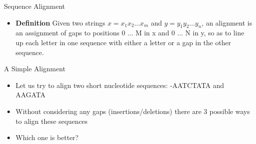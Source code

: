 \documentclass{bredelebeamer}
\begin{document}
\begin{frame}{Sequence Alignment}
    \begin{itemize}
        \item \textbf{\large{Definition}}
        \linebreak
        \linebreak
        Given two strings $x = x_1 x_2 ... x_m$ and $y = y_1 y_2 ... y_n$, \linebreak
        an alignment is an assignment of gaps to positions 0 ... M in x and 0 ... N in y, so as to line up each letter in one sequence with either a letter or a gap in the other sequence.
    \end{itemize}
\end{frame}
\begin{frame}{A Simple Alignment}
    \begin{itemize}
        \item Let us try to align two short nucleotide sequences:\linebreak
        -AATCTATA and AAGATA\linebreak
        \linebreak
        \item Without considering any gaps (insertions/deletions) there are 3 possible ways to align these sequences\linebreak
        \linebreak
\linebreak
    \item Which one is better?
    \end{itemize}
\end{frame}
\end{document}
